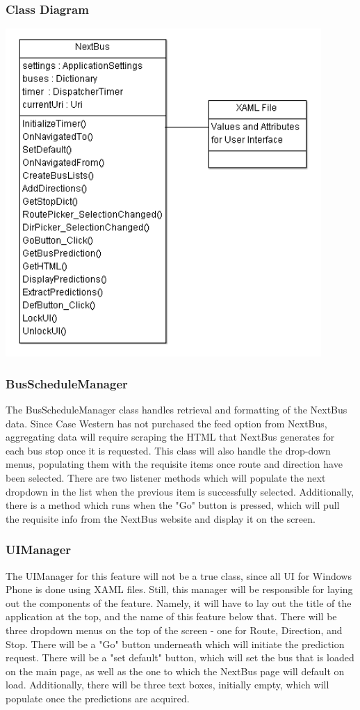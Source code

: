 \documentclass[pdftex,12pt,letter]{article}
\begin{document}
\subsubsection{Class Diagram}
\begin{flushleft}
\includegraphics[width=120mm]{nextbusCD.png}
\end{flushleft}
\subsubsection{BusScheduleManager}
The BusScheduleManager class handles retrieval and formatting of the NextBus data. Since Case Western has not purchased the feed option from NextBus, aggregating data will require scraping the HTML that NextBus generates for each bus stop once it is requested. This class will also handle the drop-down menus, populating them with the requisite items once route and direction have been selected. There are two listener methods which will populate the next dropdown in the list when the previous item is successfully selected. Additionally, there is a method which runs when the "Go" button is pressed, which will pull the requisite info from the NextBus website and display it on the screen.
\subsubsection{UIManager}
The UIManager for this feature will not be a true class, since all UI for Windows Phone is done using XAML files. Still, this manager will be responsible for laying out the components of the feature. Namely, it will have to lay out the title of the application at the top, and the name of this feature below that. There will be three dropdown menus on the top of the screen - one for Route, Direction, and Stop. There will be a "Go" button underneath which will initiate the prediction request. There will be a "set default" button, which will set the bus that is loaded on the main page, as well as the one to which the NextBus page will default on load. Additionally, there will be three text boxes, initially empty, which will populate once the predictions are acquired.
\end{document}
